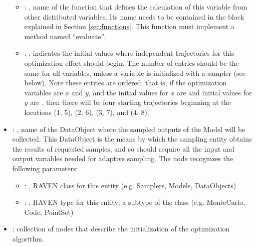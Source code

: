 \begin{itemize}
\begin{itemize}
        \item {}: ,
          name of the function that               defines the calculation of this variable from
          other distributed variables.  Its name               needs to be contained in the
           block explained in Section               \ref{sec:functions}. This
          function must implement a method named ``evaluate''.               

        \item {}: ,
          indicates the initial values where independent trajectories for this optimization
          effort should begin. The number of entries should be the same for all variables, unless
          a variable is initialized with a sampler (see  below). Note these
          entries are ordered; that is, if the optimization variables are $x$ and $y$, and the
          initial               values for $x$ are  and initial values for $y$
          are ,               then there will be four starting trajectories
          beginning at the locations (1, 5), (2, 6),               (3, 7), and (4, 8).
      \end{itemize}

    \item {}: ,
      name of the DataObject where the sampled outputs of the Model will be collected.
      This DataObject is the means by which the sampling entity obtains the results of requested
      samples, and so should require all the input and output variables needed for adaptive
      sampling.
      The  node recognizes the following parameters:
        \begin{itemize}
          \item {}: ,
            RAVEN class for this entity (e.g. Samplers, Models, DataObjects)
          \item {}: ,
            RAVEN type for this entity; a subtype of the class (e.g. MonteCarlo, Code, PointSet)
      \end{itemize}

    \item {}:
      collection of nodes that describe the initialization of the optimization algorithm.


\end{itemize}
